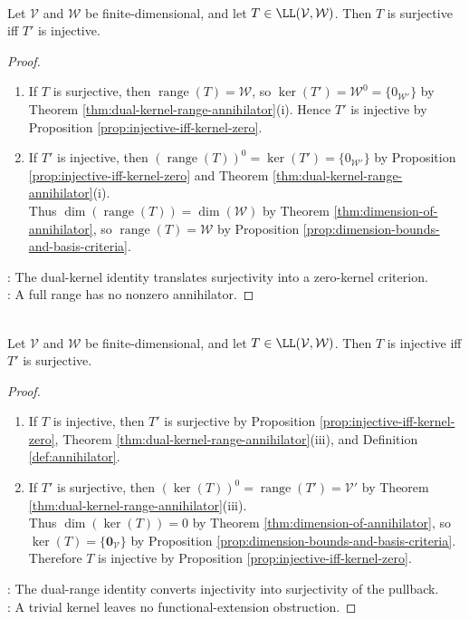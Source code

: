 \begin{corollary} \label{cor:surjective-iff-dual-injective} \\
Let $\mathcal{V}$ and $\mathcal{W}$ be finite-dimensional, and let $T\in\LL(\mathcal{V},\mathcal{W})$. Then $T$ is surjective iff $T'$ is injective.
\begin{proof}
\begin{enumerate}[label=\roman*.]
\setlength{\itemsep}{0pt}
\item[$(\Rightarrow)$] If $T$ is surjective, then $\operatorname{range}(T)=\mathcal{W}$, so $\ker(T')=\mathcal{W}^0=\{0_{\mathcal{W}'}\}$ by Theorem \ref{thm:dual-kernel-range-annihilator}(i). Hence $T'$ is injective by Proposition \ref{prop:injective-iff-kernel-zero}.
\item[$(\Leftarrow)$] If $T'$ is injective, then $(\operatorname{range}(T))^0=\ker(T')=\{0_{\mathcal{W}'}\}$ by Proposition \ref{prop:injective-iff-kernel-zero} and Theorem \ref{thm:dual-kernel-range-annihilator}(i). \\
Thus $\dim(\operatorname{range}(T))=\dim(\mathcal{W})$ by Theorem \ref{thm:dimension-of-annihilator}, so $\operatorname{range}(T)=\mathcal{W}$ by Proposition \ref{prop:dimension-bounds-and-basis-criteria}.
\end{enumerate}
: The dual-kernel identity translates surjectivity into a zero-kernel criterion.\\
: A full range has no nonzero annihilator.
\end{proof}
\end{corollary}

\begin{corollary} \label{cor:injective-iff-dual-surjective} \\
Let $\mathcal{V}$ and $\mathcal{W}$ be finite-dimensional, and let $T\in\LL(\mathcal{V},\mathcal{W})$. Then $T$ is injective iff $T'$ is surjective.
\begin{proof}
\begin{enumerate}[label=\roman*.]
\setlength{\itemsep}{0pt}
\item[$(\Rightarrow)$] If $T$ is injective, then $T'$ is surjective by Proposition \ref{prop:injective-iff-kernel-zero}, Theorem \ref{thm:dual-kernel-range-annihilator}(iii), and Definition \ref{def:annihilator}.
\item[$(\Leftarrow)$] If $T'$ is surjective, then $(\ker(T))^0=\operatorname{range}(T')=\mathcal{V}'$ by Theorem \ref{thm:dual-kernel-range-annihilator}(iii).\\
Thus $\dim(\ker(T))=0$ by Theorem \ref{thm:dimension-of-annihilator}, so $\ker(T)=\{\mathbf{0}_{\mathcal{V}}\}$ by Proposition \ref{prop:dimension-bounds-and-basis-criteria}. Therefore $T$ is injective by Proposition \ref{prop:injective-iff-kernel-zero}.
\end{enumerate}
: The dual-range identity converts injectivity into surjectivity of the pullback.\\
: A trivial kernel leaves no functional-extension obstruction.
\end{proof}
\end{corollary}

